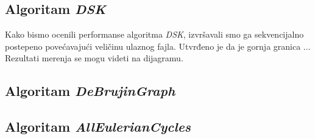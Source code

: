 \documentclass[12pt,oneside]{memoir}
\begin{document}
\newpage

\subsection{Algoritam \textit{DSK}}

Kako bismo ocenili performanse algoritma \textit{DSK}, izvršavali smo ga sekvencijalno postepeno povećavajući veličinu ulaznog fajla. Utvrđeno je da je gornja granica ... Rezultati merenja se mogu videti na dijagramu.


\subsection{Algoritam \textit{DeBrujinGraph}}
\label{odeljak:debrujinRezultati}


% 


% 


\subsection{Algoritam \textit{AllEulerianCycles}}

\end{document}
